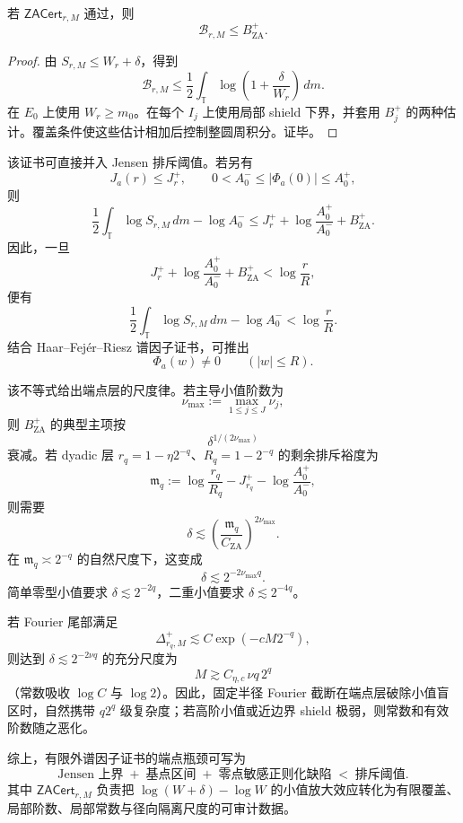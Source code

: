 \begin{theorem}[零点敏感正则化缺陷证书的正确性]\label{thm:typed-address-biaxial-completion-zero-aware-regularization-certificate-soundness}
若 \(\mathsf{ZACert}_{r,M}\) 通过，则
\[
\mathcal B_{r,M}\le B_{\mathrm{ZA}}^+.
\]
\end{theorem}
\begin{proof}
由 \(S_{r,M}\le W_r+\delta\)，得到
\[
\mathcal B_{r,M}
\le
\frac12\int_{\mathbb T}
\log\left(1+\frac{\delta}{W_r}\right)\,dm.
\]
在 \(E_0\) 上使用 \(W_r\ge m_0\)。在每个 \(I_j\) 上使用局部 shield 下界，并套用 \(B_j^+\) 的两种估计。覆盖条件使这些估计相加后控制整圆周积分。证毕。
\end{proof}

该证书可直接并入 Jensen 排斥阈值。若另有
\[
J_a(r)\le J_r^+,
\qquad
0<A_0^-\le|\Phi_a(0)|\le A_0^+,
\]
则
\[
\frac12\int_{\mathbb T}\log S_{r,M}\,dm-\log A_0^-
\le
J_r^+
+
\log\frac{A_0^+}{A_0^-}
+
B_{\mathrm{ZA}}^+.
\]
因此，一旦
\[
J_r^+
+
\log\frac{A_0^+}{A_0^-}
+
B_{\mathrm{ZA}}^+
<
\log\frac rR,
\]
便有
\[
\frac12\int_{\mathbb T}\log S_{r,M}\,dm-\log A_0^-
<
\log\frac rR.
\]
结合 Haar--Fej\'er--Riesz 谱因子证书，可推出
\[
\Phi_a(w)\ne0
\qquad(|w|\le R).
\]

该不等式给出端点层的尺度律。若主导小值阶数为
\[
\nu_{\max}:=\max_{1\le j\le J}\nu_j,
\]
则 \(B_{\mathrm{ZA}}^+\) 的典型主项按
\[
\delta^{1/(2\nu_{\max})}
\]
衰减。若 dyadic 层 \(r_q=1-\eta2^{-q}\)、\(R_q=1-2^{-q}\) 的剩余排斥裕度为
\[
\mathfrak m_q
:=
\log\frac{r_q}{R_q}
-
J_{r_q}^+
-
\log\frac{A_0^+}{A_0^-},
\]
则需要
\[
\delta
\lesssim
\left(\frac{\mathfrak m_q}{C_{\mathrm{ZA}}}\right)^{2\nu_{\max}}.
\]
在 \(\mathfrak m_q\asymp2^{-q}\) 的自然尺度下，这变成
\[
\delta\lesssim2^{-2\nu_{\max}q}.
\]
简单零型小值要求 \(\delta\lesssim2^{-2q}\)，二重小值要求 \(\delta\lesssim2^{-4q}\)。

若 Fourier 尾部满足
\[
\Delta_{r_q,M}^+\lesssim C\exp(-cM2^{-q}),
\]
则达到 \(\delta\lesssim2^{-2\nu q}\) 的充分尺度为
\[
M
\gtrsim
C_{\eta,c}\,\nu q\,2^q
\]
（常数吸收 \(\log C\) 与 \(\log 2\)）。因此，固定半径 Fourier 截断在端点层破除小值盲区时，自然携带 \(q2^q\) 级复杂度；若高阶小值或近边界 shield 极弱，则常数和有效阶数随之恶化。

综上，有限外谱因子证书的端点瓶颈可写为
\[
\text{Jensen 上界}
\;+\;
\text{基点区间}
\;+\;
\text{零点敏感正则化缺陷}
\;<\;
\text{排斥阈值}.
\]
其中 \(\mathsf{ZACert}_{r,M}\) 负责把 \(\log(W+\delta)-\log W\) 的小值放大效应转化为有限覆盖、局部阶数、局部常数与径向隔离尺度的可审计数据。
